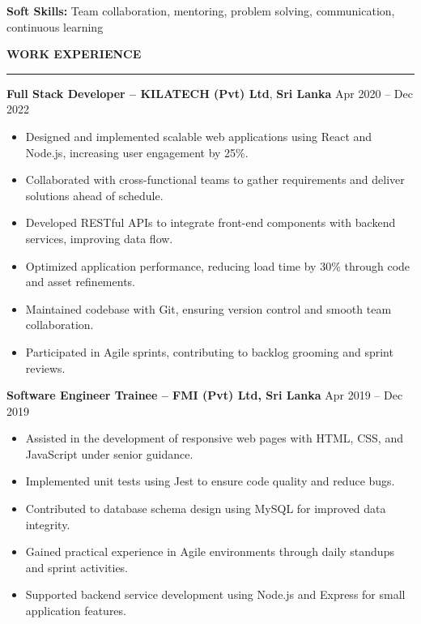 \documentclass[10pt,letterpaper]{article}
\begin{document}
\textbf{Soft Skills:} Team collaboration, mentoring, problem solving, communication, continuous learning

\vspace{6pt}

\textbf{WORK EXPERIENCE}\\[-8pt]
\noindent\rule{\textwidth}{1pt}

\vspace{-2pt}

\textbf{Full Stack Developer -- KILATECH (Pvt) Ltd}, \textbf{Sri Lanka} \hfill Apr 2020 -- Dec 2022

\vspace{1pt}

\begin{itemize}
\item Designed and implemented scalable web applications using React and Node.js, increasing user engagement by 25\%.
\item Collaborated with cross-functional teams to gather requirements and deliver solutions ahead of schedule.
\item Developed RESTful APIs to integrate front-end components with backend services, improving data flow.
\item Optimized application performance, reducing load time by 30\% through code and asset refinements.
\item Maintained codebase with Git, ensuring version control and smooth team collaboration.
\item Participated in Agile sprints, contributing to backlog grooming and sprint reviews.
\end{itemize}

\textbf{Software Engineer Trainee -- FMI (Pvt) Ltd, Sri Lanka} \hfill Apr 2019 -- Dec 2019

\vspace{1pt}

\begin{itemize}
\item Assisted in the development of responsive web pages with HTML, CSS, and JavaScript under senior guidance.
\item Implemented unit tests using Jest to ensure code quality and reduce bugs.
\item Contributed to database schema design using MySQL for improved data integrity.
\item Gained practical experience in Agile environments through daily standups and sprint activities.
\item Supported backend service development using Node.js and Express for small application features.
\end{itemize}
\end{document}
